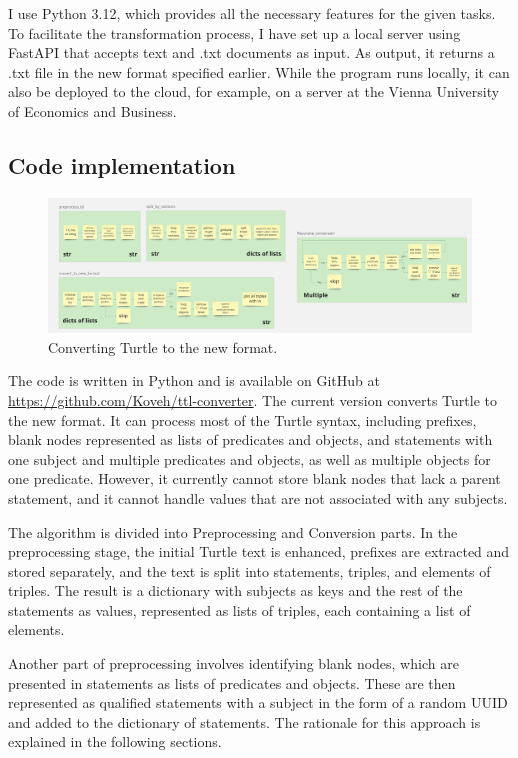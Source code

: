 I use Python 3.12, which provides all the necessary features for the given tasks. To facilitate the transformation process, I have set up a local server using FastAPI that accepts text and .txt documents as input. As output, it returns a .txt file in the new format specified earlier. While the program runs locally, it can also be deployed to the cloud, for example, on a server at the Vienna University of Economics and Business.

\subsection{Code implementation}
\begin{figure}[htbp]
    \centering
    \includegraphics[width=1\textwidth]{18.png}
    \caption{Converting Turtle to the new format.}
    \label{fig:image18}
\end{figure}

The code is written in Python and is available on GitHub at \url{https://github.com/Koveh/ttl-converter}. The current version converts Turtle to the new format. It can process most of the Turtle syntax, including prefixes, blank nodes represented as lists of predicates and objects, and statements with one subject and multiple predicates and objects, as well as multiple objects for one predicate. However, it currently cannot store blank nodes that lack a parent statement, and it cannot handle values that are not associated with any subjects.


The algorithm is divided into Preprocessing and Conversion parts. In the preprocessing stage, the initial Turtle text is enhanced, prefixes are extracted and stored separately, and the text is split into statements, triples, and elements of triples. The result is a dictionary with subjects as keys and the rest of the statements as values, represented as lists of triples, each containing a list of elements.

Another part of preprocessing involves identifying blank nodes, which are presented in statements as lists of predicates and objects. These are then represented as qualified statements with a subject in the form of a random UUID and added to the dictionary of statements. The rationale for this approach is explained in the following sections.

